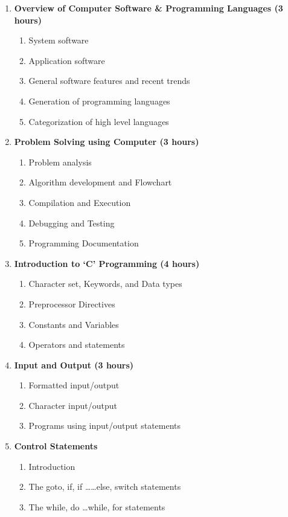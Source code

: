 \begin{enumerate}
    \item \textbf{ Overview of Computer Software \& Programming Languages \hfill (3 hours)}
    \begin{enumerate}
        \item System software
        \item Application software
        \item General software features and recent trends
        \item Generation of programming languages
        \item Categorization of high level languages
    \end{enumerate}
    
    \item \textbf{ Problem Solving using Computer \hfill (3 hours)}
    \begin{enumerate}
        \item Problem analysis
        \item Algorithm development and Flowchart
        \item Compilation and Execution
        \item Debugging and Testing
        \item Programming Documentation
    \end{enumerate}
    
    \item \textbf{ Introduction to `C' Programming \hfill (4 hours)}
    \begin{enumerate}
        \item Character set, Keywords, and Data types
        \item Preprocessor Directives
        \item Constants and Variables
        \item Operators and statements
    \end{enumerate}
    
    \item \textbf{ Input and Output \hfill (3 hours)}
    \begin{enumerate}
        \item Formatted input/output
        \item Character input/output
        \item Programs using input/output statements
    \end{enumerate}
    
    \item \textbf{ Control Statements}
    \begin{enumerate}
        \item Introduction
        \item The goto, if, if \ldots \ldots else, switch statements
        \item The while, do \ldots while, for statements
    \end{enumerate}
    

\end{enumerate}
